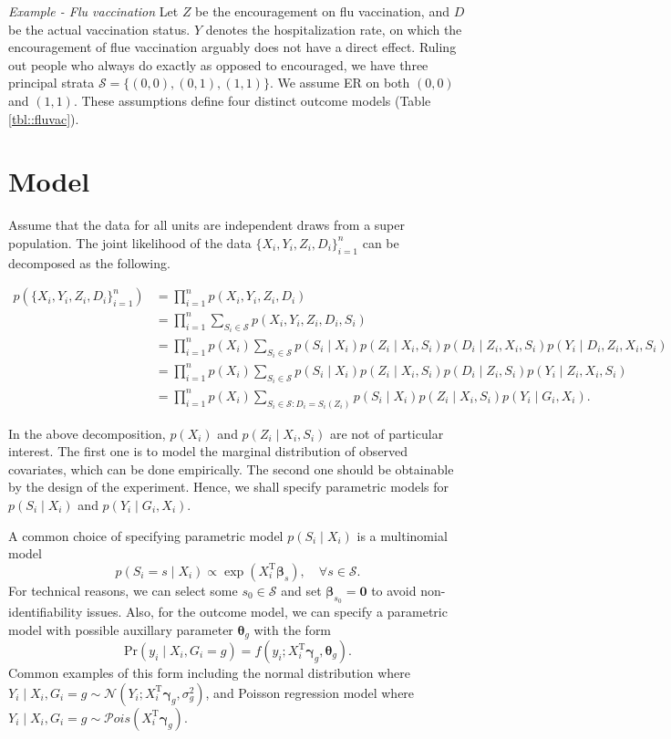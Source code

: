 \documentclass{article}
\begin{document}
\emph{Example - Flu vaccination} Let $Z$ be the encouragement on flu vaccination, and $D$ be the actual vaccination status. $Y$ denotes the hospitalization rate, on which the encouragement of flue vaccination arguably does not have a direct effect. Ruling out people who always do exactly as opposed to encouraged, we have three principal strata $\mathcal{S} = \{(0, 0), (0, 1), (1, 1)\}$. We assume ER on both $(0, 0)$ and $(1, 1)$. These assumptions define four distinct outcome models (Table \ref{tbl::fluvac}). 

\section{Model}
Assume that the data for all units are independent draws from a super population. The joint likelihood of the data $\{X_i, Y_i, Z_i, D_i\}_{i = 1}^n$ can be decomposed as the following.

$$\begin{aligned}
  p(\{X_i, Y_i, Z_i, D_i\}_{i = 1}^n) &= \prod_{i=1}^n p(X_i, Y_i, Z_i, D_i) \\
  &= \prod_{i=1}^n \sum_{S_i\in\mathcal{S}} p(X_i, Y_i, Z_i, D_i, S_i) \\
  &= \prod_{i=1}^n p(X_i)\sum_{S_i\in \mathcal{S}}p(S_i\mid X_i) p(Z_i\mid X_i, S_i)p(D_i \mid Z_i, X_i, S_i) p(Y_i\mid D_i, Z_i, X_i, S_i) \\
  &= \prod_{i=1}^n p(X_i)\sum_{S_i\in \mathcal{S}}p(S_i\mid X_i) p(Z_i\mid X_i, S_i)p(D_i \mid Z_i, S_i) p(Y_i\mid Z_i, X_i, S_i) \\
  &= \prod_{i=1}^n p(X_i)\sum_{S_i\in \mathcal{S}: D_i = S_i(Z_i)}p(S_i\mid X_i) p(Z_i\mid X_i, S_i)p(Y_i\mid G_i, X_i).
\end{aligned}$$

In the above decomposition, $p(X_i)$ and $p(Z_i\mid X_i, S_i)$ are not of particular interest. The first one is to model the marginal distribution of observed covariates, which can be done empirically. The second one should be obtainable by the design of the experiment. Hence, we shall specify parametric models for $p(S_i\mid X_i)$ and $p(Y_i\mid G_i, X_i)$.

A common choice of specifying parametric model $p(S_i\mid X_i)$ is a multinomial model $$p(S_i = s\mid X_i) \propto \exp(X_i^\mathrm{T} \boldsymbol{\beta}_s), \quad\forall s \in \mathcal{S}.$$ For technical reasons, we can select some $s_0\in\mathcal{S}$ and set $\boldsymbol{\beta}_{s_0} = \boldsymbol{0}$ to avoid non-identifiability issues. Also, for the outcome model, we can specify a parametric model with possible auxillary parameter $\boldsymbol{\theta}_g$ with the form $$\mathrm{Pr}(y_i\mid X_i, G_i = g) = f(y_i; X_i^\mathrm{T}\boldsymbol{\gamma}_g, \boldsymbol{\theta}_g).$$
Common examples of this form including the normal distribution where $Y_i \mid X_i, G_i = g \sim \mathcal{N}(Y_i; X_i^\mathrm{T}\boldsymbol{\gamma}_g, \sigma_g^2)$, and Poisson regression model where $Y_i\mid X_i, G_i = g\sim \mathcal{P}ois(X_i^\mathrm{T}\boldsymbol{\gamma}_g)$.
\end{document}
